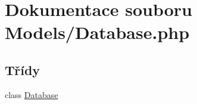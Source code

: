 \hypertarget{_database_8php}{\section{Dokumentace souboru Models/\-Database.php}
\label{_database_8php}
}
\subsection*{Třídy}
\begin{DoxyCompactItemize}
\item 
class \hyperlink{class_database}{Database}
\end{DoxyCompactItemize}
